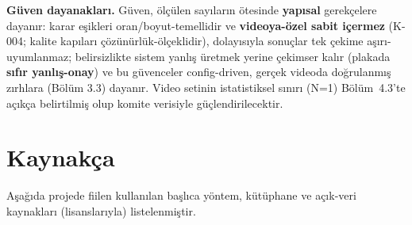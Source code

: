 \documentclass[12pt,a4paper]{article}
\begin{document}
\textbf{Güven dayanakları.} Güven, ölçülen sayıların ötesinde \textbf{yapısal} gerekçelere
dayanır: karar eşikleri oran/boyut-temellidir ve \textbf{videoya-özel sabit içermez} (K-004; kalite kapıları çözünürlük-ölçeklidir), dolayısıyla
sonuçlar tek çekime aşırı-uyumlanmaz; belirsizlikte sistem yanlış üretmek yerine çekimser kalır
(plakada \textbf{sıfır yanlış-onay}) ve bu güvenceler config-driven, gerçek videoda doğrulanmış zırhlara
(Bölüm 3.3) dayanır. Video setinin istatistiksel sınırı (N=1) Bölüm~4.3'te açıkça belirtilmiş olup
komite verisiyle güçlendirilecektir.

\section{Kaynakça}
{\footnotesize Aşağıda projede fiilen kullanılan başlıca yöntem, kütüphane ve açık-veri kaynakları (lisanslarıyla) listelenmiştir.\par}
\footnotesize\sloppy
\end{document}

